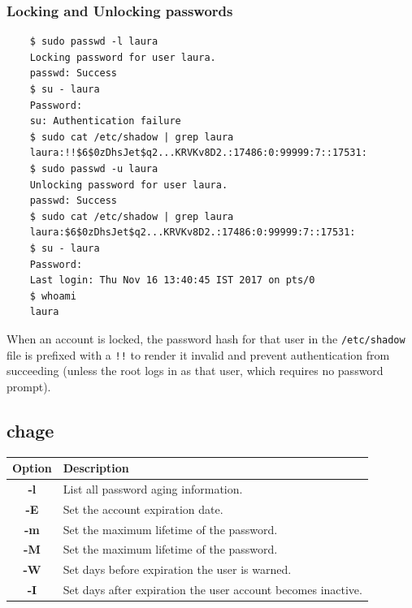 \documentclass{report}
\begin{document}
	\subsubsection{Locking and Unlocking passwords}
	\vspace{-10pt}
	\begin{verbatim}
	$ sudo passwd -l laura
	Locking password for user laura.
	passwd: Success
	$ su - laura
	Password: 
	su: Authentication failure
	$ sudo cat /etc/shadow | grep laura
	laura:!!$6$0zDhsJet$q2...KRVKv8D2.:17486:0:99999:7::17531:
	$ sudo passwd -u laura
	Unlocking password for user laura.
	passwd: Success
	$ sudo cat /etc/shadow | grep laura
	laura:$6$0zDhsJet$q2...KRVKv8D2.:17486:0:99999:7::17531:
	$ su - laura
	Password: 
	Last login: Thu Nov 16 13:40:45 IST 2017 on pts/0
	$ whoami
	laura
	\end{verbatim}
	
	\noindent
	When an account is locked, the password hash for that user in the \verb|/etc/shadow| file is prefixed with a \verb|!!| to render it invalid and prevent authentication from succeeding (unless the root logs in as that user, which requires no password prompt).	

	\subsection{chage}
	\begin{tabular}{cl}
		\toprule
		\textbf{Option} &\textbf{Description} \\
		\midrule
		\textbf{-l} &List all password aging information. \\	
		\textbf{-E} &Set the account expiration date. \\	\textbf{-m} &Set the maximum lifetime of the password. \\
		\textbf{-M} &Set the maximum lifetime of the password. \\
		\textbf{-W} &Set days before expiration the user is warned. \\ 
		\textbf{-I} &Set days after expiration the user account becomes inactive. \\
		\bottomrule
	\end{tabular}
\end{document}
